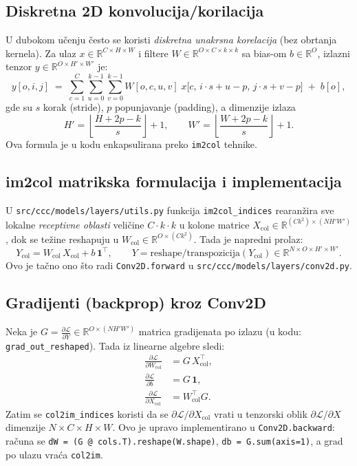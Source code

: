 \documentclass[11pt,a4paper]{article}
\begin{document}
\subsection{Diskretna 2D konvolucija/korilacija}
U dubokom učenju često se koristi \emph{diskretna unakrsna korelacija} (bez obrtanja kernela). Za ulaz $x \in \mathbb{R}^{C\times H\times W}$ i filtere $W \in \mathbb{R}^{O\times C\times k\times k}$ sa bias-om $b\in\mathbb{R}^{O}$, izlazni tenzor $y \in \mathbb{R}^{O\times H'\times W'}$ je:
\begin{equation}
 y[o,i,j] \;=\; \sum_{c=1}^{C} \sum_{u=0}^{k-1} \sum_{v=0}^{k-1} W[o,c,u,v]\; x\bigl[c,\, i\cdot s + u - p,\, j\cdot s + v - p\bigr] \; + \; b[o],
\end{equation}
gde su $s$ korak (stride), $p$ popunjavanje (padding), a dimenzije izlaza
\begin{equation}
 H' = \left\lfloor\frac{H + 2p - k}{s}\right\rfloor + 1, \qquad W' = \left\lfloor\frac{W + 2p - k}{s}\right\rfloor + 1.
\end{equation}
Ova formula je u kodu enkapsulirana preko \texttt{im2col} tehnike.

\subsection{im2col matrikska formulacija i implementacija}
U \texttt{src/ccc/models/layers/utils.py} funkcija \texttt{im2col\_indices} rearanžira sve lokalne \emph{receptivne oblasti} veličine $C\cdot k\cdot k$ u kolone matrice $X_{\text{col}} \in \mathbb{R}^{(Ck^2)\times (N H' W')}$, dok se težine reshapuju u $W_{\text{col}} \in \mathbb{R}^{O\times (Ck^2)}$. Tada je napredni prolaz:
\begin{equation}
 Y_{\text{col}} = W_{\text{col}}\, X_{\text{col}} + b\,\mathbf{1}^\top, \qquad Y = \text{reshape/transpozicija}(Y_{\text{col}}) \in \mathbb{R}^{N\times O\times H'\times W'}.
\end{equation}
Ovo je tačno ono što radi \texttt{Conv2D.forward} u \texttt{src/ccc/models/layers/conv2d.py}.

\subsection{Gradijenti (backprop) kroz Conv2D}
Neka je $G = \frac{\partial \mathcal{L}}{\partial Y} \in \mathbb{R}^{O\times (N H' W')}$ matrica gradijenata po izlazu (u kodu: \texttt{grad\_out\_reshaped}). Tada iz linearne algebre sledi:
\begin{align}
 \frac{\partial \mathcal{L}}{\partial W_{\text{col}}} &= G\, X_{\text{col}}^\top, \\
 \frac{\partial \mathcal{L}}{\partial b} &= G\, \mathbf{1}, \\
 \frac{\partial \mathcal{L}}{\partial X_{\text{col}}} &= W_{\text{col}}^\top \! G.
\end{align}
Zatim se \texttt{col2im\_indices} koristi da se $\partial \mathcal{L}/\partial X_{\text{col}}$ vrati u tenzorski oblik $\partial \mathcal{L}/\partial X$ dimenzije $N\times C\times H\times W$. Ovo je upravo implementirano u \texttt{Conv2D.backward}: računa se \texttt{dW = (G @ cols.T).reshape(W.shape)}, \texttt{db = G.sum(axis=1)}, a grad po ulazu vraća \texttt{col2im}.
\end{document}
